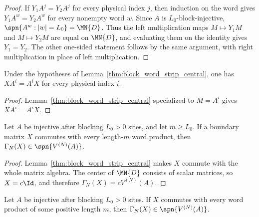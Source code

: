\begin{proof}
    \leanok
    If $Y_1 A^j = Y_2 A^j$ for every physical index $j$, then induction on the
    word gives $Y_1 A^w = Y_2 A^w$ for every nonempty word $w$. Since $A$ is
    $L_0$-block-injective, $\spn\{A^w : |w|=L_0\}=\MN{D}$. Thus the left
    multiplication maps $M\mapsto Y_1 M$ and $M\mapsto Y_2 M$ are equal on
    $\MN{D}$, and evaluating them on the identity gives $Y_1=Y_2$. The other
    one-sided statement follows by the same argument, with right multiplication
    in place of left multiplication.
\end{proof}

\begin{lemma}
    \label{lem:boundary_matrix_commutes_long_words}
    \leanok
    Under the hypotheses of Lemma~\ref{thm:block_word_strip_central}, one has
    $X A^i = A^i X$ for every physical index $i$.
\end{lemma}

\begin{proof}
    \leanok
    Lemma~\ref{thm:block_word_strip_central} specialized to $M = A^i$ gives
    $X A^i = A^i X$.
\end{proof}

\begin{lemma}
    \label{thm:ground_space_map_mpv_of_long_word_commutes}
    \leanok
    Let $A$ be injective after blocking $L_0>0$ sites, and let $m \ge L_0$. If
    a boundary matrix $X$ commutes with every length-$m$ word product, then
    $\Gamma_N(X)\in\spn\{V^{(N)}(A)\}$.
\end{lemma}

\begin{proof}
    \leanok
    Lemma~\ref{thm:block_word_strip_central} makes $X$ commute with the whole
    matrix algebra. The center of $\MN{D}$ consists of scalar matrices, so
    $X=c\Id$, and therefore $\Gamma_N(X)=cV^{(N)}(A)$.
\end{proof}

\begin{lemma}
    \label{thm:ground_space_map_mpv_of_positive_word_commutes}
    \leanok
    Let $A$ be injective after blocking $L_0>0$ sites. If $X$ commutes with
    every word product of some positive length $m$, then
    $\Gamma_N(X)\in\spn\{V^{(N)}(A)\}$.
\end{lemma}

